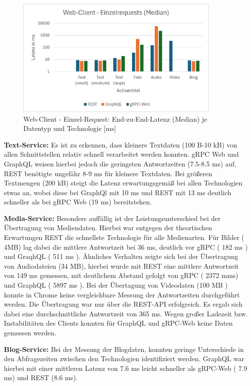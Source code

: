 \begin{figure}[htbp]
	\centering
	\includegraphics[width=0.9\textwidth]{images/Webclient.png}
	\caption{Web-Client - Einzel-Request: End-zu-End-Latenz (Median) je Datentyp und Technologie [ms]}
	\label{fig:webclient-single-median}
\end{figure}

\textbf{Text-Service:}  
Es ist zu erkennen, dass kleinere Textdaten (100 B-10 kB) von allen Schnittstellen relativ schnell verarbeitet werden konnten. gRPC Web und GraphQL weisen hierbei jedoch die geringsten Antwortzeiten (7.5-8.5 ms) auf, REST benötigte ungefähr 8-9 ms für kleinere Textdaten. Bei größeren Textmengen (200 kB) steigt die Latenz erwartungsgemäß bei allen Technologien etwas an, wobei diese bei GraphQl mit 10 ms und REST mit 13 ms deutlich schneller als bei gRPC Web (19 ms) bereitstehen. 

\textbf{Media-Service:}  
Besonders auffällig ist der Leistungsunterschied bei der Übertragung von Mediendaten.
Hierbei war entgegen der theortischen Erwartungen REST die schnellste Technologie für alle Medienarten. Für Bilder ( 4MB) lag dabei die mittlere Antwortzeit bei 36 ms, deutlich vor gRPC ( 182 ms ) und GraqhQL ( 511 ms ).
Ähnliches Verhalten zeigte sich bei der Übertragung von Audiodateien (34 MB), hierbei wurde mit REST eine mittlere Antwortzeit von 149 ms gemessen, mit deutlichem Abstand gefolgt von gRPC ( 2372 mms) und GraphQL ( 5897  ms ).
Bei der Übertagung von Videodaten (100 MB ) konnte in Chrome keine vergleichbare Messung der Antwortzeiten durchgeführt werden. Die Übertragung war nur über die REST-API erfolgreich. Es ergab sich dabei eine durchschnittliche Antwortzeit von 365 ms. Wegen großer Ladezeit bzw. Instabilitäten des Clients konnten für GraphQL und gRPC-Web keine Daten gemessen werden. 


\textbf{Blog-Service:}  
Bei der Messung der Blogdaten, konnten geringe Unterschiede in den Abfragezeiten zwischen den Technologien identifiziert werden. GraphQL war hierbei mit einer mittleren Latenz von 7.6 ms leicht schneller als gRPC-Web ( 7.9 ms) und REST (8.6 ms).

